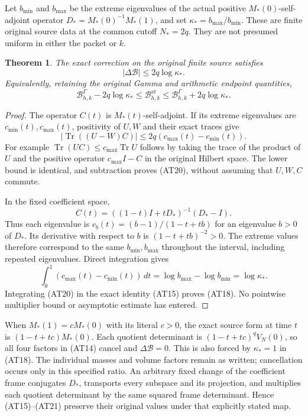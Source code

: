 \documentclass[11pt]{article}
\newcommand{\Tr}{\operatorname{Tr}}
\newcommand{\ar}{\mathrm{ar}}
\newcommand{\Ga}{\Gamma}
\newtheorem{theorem}{Theorem}
\begin{document}
Let $b_{\min}$ and $b_{\max}$ be the extreme eigenvalues of the
actual positive $M_*(0)$-self-adjoint operator
$D_*=M_*(0)^{-1}M_*(1)$, and set
$\kappa_*=b_{\max}/b_{\min}$. These are finite original source
data at the common cutoff $N_*=2q$. They are not presumed
uniform in either the packet or $k$.

\begin{theorem}
The exact correction on the original finite source satisfies
\[
 \boxed{|\Delta\mathcal B|\le2q\log\kappa_* .}             \tag{AT18}
\]
Equivalently, retaining the original Gamma and arithmetic endpoint
quantities,
\[
 \mathcal B^\Ga_{h,k}-2q\log\kappa_*
 \le\mathcal B^\ar_{h,k}
 \le\mathcal B^\Ga_{h,k}+2q\log\kappa_* .                \tag{AT19}
\]
\end{theorem}
\begin{proof}
The operator $C(t)$ is $M_*(t)$-self-adjoint. If its extreme
eigenvalues are $c_{\min}(t),c_{\max}(t)$, positivity of $U,W$
and their exact traces give
\[
 |\Tr((U-W)C)|\le2q(c_{\max}(t)-c_{\min}(t)).             \tag{AT20}
\]
For example $\Tr(UC)\le c_{\max}\Tr U$ follows by taking
the trace of the product of $U$ and the positive operator
$c_{\max}I-C$ in the original Hilbert space. The lower bound
is identical, and subtraction proves (AT20), without assuming
that $U,W,C$ commute.

In the fixed coefficient space,
\[
 C(t)=((1-t)I+tD_*)^{-1}(D_*-I).
\]
Thus each eigenvalue is
$c_b(t)=(b-1)/(1-t+tb)$ for an eigenvalue $b>0$ of $D_*$.
Its derivative with respect to $b$ is $(1-t+tb)^{-2}>0$.
The extreme values therefore correspond to the same
$b_{\min},b_{\max}$ throughout the interval, including repeated
eigenvalues. Direct integration gives
\[
 \int_0^1(c_{\max}(t)-c_{\min}(t))\,dt
 =\log b_{\max}-\log b_{\min}=\log\kappa_* .             \tag{AT21}
\]
Integrating (AT20) in the exact identity (AT15) proves (AT18).
No pointwise multiplier bound or asymptotic estimate has entered.
\end{proof}

When $M_*(1)=cM_*(0)$ with its literal $c>0$, the exact source
form at time $t$ is $(1-t+tc)M_*(0)$. Each quotient determinant
is $(1-t+tc)^qV_N(0)$, so all four factors in (AT14) cancel
and $\Delta\mathcal B=0$. This is also forced by
$\kappa_*=1$ in (AT18). The individual masses and volume
factors remain as written; cancellation occurs only in this
specified ratio. An arbitrary fixed change of the coefficient
frame conjugates $D_*$, transports every subspace and its
projection, and multiplies each quotient determinant by the
same squared frame determinant. Hence (AT15)--(AT21) preserve
their original values under that explicitly stated map.
\end{document}
